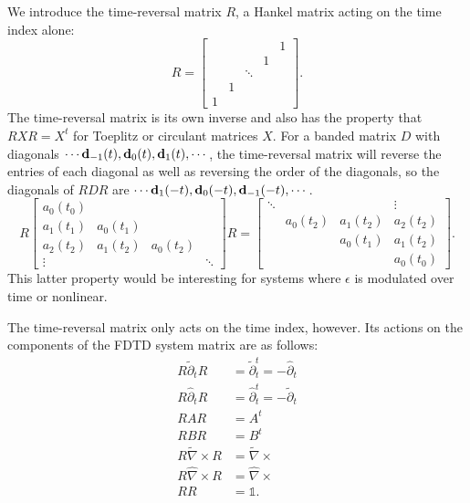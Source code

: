 We introduce the time-reversal matrix $R$, a Hankel matrix acting on the time index alone:
%
\begin{equation}
R =
\begin{bmatrix}
& & & & 1 \\
& & & 1 & \\
& & \ddots & &\\
& 1 & & & \\
1 & & & &
\end{bmatrix}.
\end{equation}
%
The time-reversal matrix is its own inverse and also has the property that $R X R = X^t$ for Toeplitz or circulant matrices $X$.  For a banded matrix $D$ with diagonals $\cdots \textbf{d}_{-1}(t), \textbf{d}_0(t), \textbf{d}_1(t), \cdots$, the time-reversal matrix will reverse the entries of each diagonal as well as reversing the order of the diagonals, so the diagonals of $R D R$ are $\cdots \textbf{d}_{1}(-t), \textbf{d}_0(-t), \textbf{d}_{-1}(-t), \cdots$.  
%
\begin{equation}
R
\begin{bmatrix}
a_0(t_0) \\
a_1(t_1) & a_0(t_1) \\
a_2(t_2) & a_1(t_2) & a_0(t_2) \\
\vdots & & & \ddots
\end{bmatrix}
R
=
\begin{bmatrix}
\ddots & & & \vdots \\
& a_0(t_2) & a_1(t_2) & a_2(t_2) \\
& & a_0(t_1) & a_1(t_2) \\
& & & a_0(t_0)
\end{bmatrix}.
\end{equation}
%
This latter property would be interesting for systems where $\epsilon$ is modulated over time or nonlinear.

The time-reversal matrix only acts on the time index, however.  Its actions on the components of the FDTD system matrix are as follows:
%
\begin{equation}
\begin{aligned}
R \tilde{\partial}_t R &= \tilde{\partial}_t^t = -\hat{\partial}_t \\
R \hat{\partial}_t R &= \hat{\partial}_t^t = -\tilde{\partial}_t \\
R A R &= A^t \\
R B R &= B^t \\
R \tilde{\nabla}\times R &= \tilde{\nabla} \times \\
R \hat{\nabla}\times R &= \hat{\nabla} \times \\
RR &= \mathbb{1}.
\end{aligned}
\end{equation}

